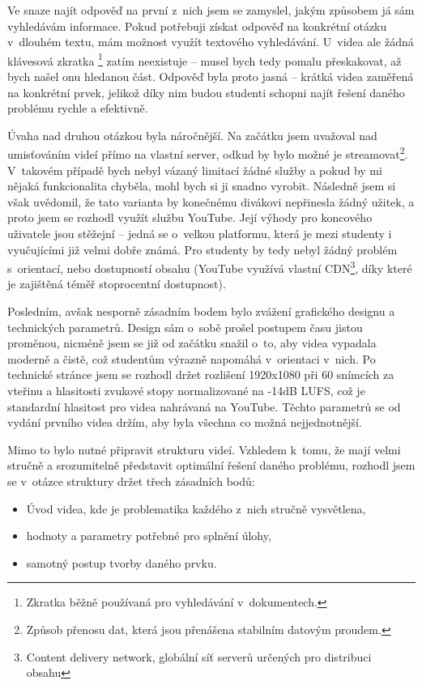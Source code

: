 Ve snaze najít odpověď na první z~nich jsem se zamyslel, jakým způsobem já sám vyhledávám informace.
Pokud potřebuji získat odpověď na konkrétní otázku v~dlouhém textu, mám možnost využít textového vyhledávání. 
U~videa ale žádná klávesová zkratka \footnote{Zkratka běžně používaná pro vyhledávání v~dokumentech.} zatím neexistuje -- musel bych tedy pomalu přeskakovat, až bych našel onu hledanou část.
Odpověď byla proto jasná -- krátká videa zaměřená na konkrétní prvek, jelikož díky nim budou studenti schopni najít řešení daného problému rychle a efektivně.

Úvaha nad druhou otázkou byla náročnější.
Na začátku jsem uvažoval nad umisťováním videí přímo na vlastní server, odkud by bylo možné je streamovat\footnote{Způsob přenosu dat, která jsou přenášena stabilním datovým proudem.}.
V~takovém případě bych nebyl vázaný limitací žádné služby a pokud by mi nějaká funkcionalita chyběla, mohl bych si ji snadno vyrobit.
Následně jsem si však uvědomil, že tato varianta by konečnému divákovi nepřinesla žádný užitek, a proto jsem se rozhodl využít službu YouTube.
Její výhody pro koncového uživatele jsou stěžejní -- jedná se o~velkou platformu, která je mezi studenty i vyučujícími již velmi dobře známá.
Pro studenty by tedy nebyl žádný problém s~orientací, nebo dostupností obsahu (YouTube využívá vlastní CDN\footnote{Content delivery network, globální síť serverů určených pro distribuci obsahu}, díky které je zajištěná téměř stoprocentní dostupnost).

Posledním, avšak nesporně zásadním bodem bylo zvážení grafického designu a technických parametrů.
Design sám o~sobě prošel postupem času jistou proměnou, nicméně jsem se již od začátku snažil o~to, aby videa vypadala moderně a čistě, což studentům výrazně napomáhá v~orientaci v~nich.
Po technické stránce jsem se rozhodl držet rozlišení 1920x1080 při 60 snímcích za vteřinu a hlasitosti zvukové stopy normalizované na -14dB LUFS, což je standardní hlasitost pro videa nahrávaná na YouTube.
Těchto parametrů se od vydání prvního videa držím, aby byla všechna co možná nejjednotnější.

Mimo to bylo nutné připravit strukturu videí.
Vzhledem k~tomu, že mají velmi stručně a srozumitelně představit optimální řešení daného problému, rozhodl jsem se v~otázce struktury držet třech zásadních bodů:
\begin{itemize}[topsep=0pt]
    \setlength\itemsep{0em}
    \item Úvod videa, kde je problematika každého z~nich stručně vysvětlena,
    \item hodnoty a parametry potřebné pro splnění úlohy,
    \item samotný postup tvorby daného prvku.
\end{itemize}

